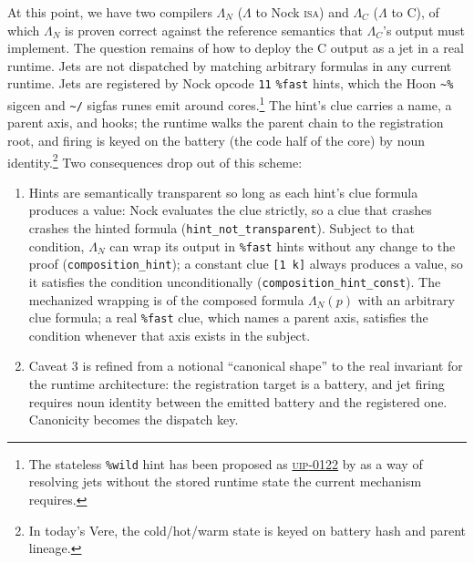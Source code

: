 \documentclass[twoside]{article}
\begin{document}
At this point, we have two compilers $\Lambda_N$ ($\Lambda$ to Nock \textsc{isa}) and $\Lambda_C$ ($\Lambda$ to C), of which $\Lambda_N$ is proven correct against the reference semantics that $\Lambda_C$'s output must implement.  The question remains of how to deploy the C output as a jet in a real runtime.  Jets are not dispatched by matching arbitrary formulas in any current runtime.  Jets are registered by Nock opcode \lstinline[style=inlinecode]{11} \lstinline[style=inlinecode]{%fast} hints, which the Hoon \lstinline[style=inlinecode]{~%} sigcen and \lstinline[style=inlinecode]{~/} sigfas runes emit around cores.\footnote{The stateless \texttt{\%wild} hint has been proposed as \href{https://github.com/urbit/UIPs/blob/main/UIPS/UIP-0122.md}{\textsc{uip}-0122} by  as a way of resolving jets without the stored runtime state the current mechanism requires.}  The hint's clue carries a name, a parent axis, and hooks; the runtime walks the parent chain to the registration root, and firing is keyed on the battery (the code half of the core) by noun identity.\footnote{In today's Vere, the cold/hot/warm state is keyed on battery hash and parent lineage.}  Two consequences drop out of this scheme:

\begin{enumerate}
  \item  Hints are semantically transparent so long as each hint's clue formula produces a value:  Nock evaluates the clue strictly, so a clue that crashes crashes the hinted formula (\lstinline[style=inlinecode]{hint_not_transparent}).  Subject to that condition, $\Lambda_{N}$ can wrap its output in \lstinline[style=inlinecode]{%fast} hints without any change to the proof (\lstinline[style=inlinecode]{composition_hint}); a constant clue \lstinline[style=inlinecode]{[1 k]} always produces a value, so it satisfies the condition unconditionally (\lstinline[style=inlinecode]{composition_hint_const}).  The mechanized wrapping is of the composed formula $\Lambda_N(p)$ with an arbitrary clue formula; a real \lstinline[style=inlinecode]{%fast} clue, which names a parent axis, satisfies the condition whenever that axis exists in the subject.
  \item  Caveat 3 is refined from a notional ``canonical shape'' to the real invariant for the runtime architecture:  the registration target is a battery, and jet firing requires noun identity between the emitted battery and the registered one.  Canonicity becomes the dispatch key.
\end{enumerate}
\end{document}
